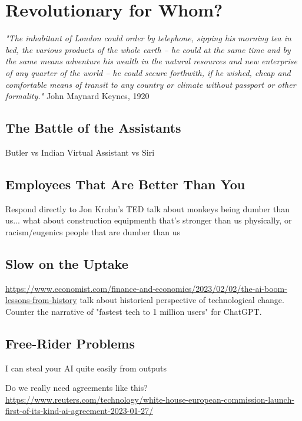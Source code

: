 \setchapterpreamble[u]{\margintoc}
\chapter{Revolutionary for Whom?}

\textit{"The inhabitant of London could order by telephone, sipping his morning tea in bed, the various products of the whole earth -- he could at the same time and by the same means adventure his wealth in the natural resources and new enterprise of any quarter of the world -- he could secure forthwith, if he wished, cheap and comfortable means of transit to any country or climate without passport or other formality."} John Maynard Keynes, 1920 \cite{Keynes2012}

\section{The Battle of the Assistants}

Butler vs Indian Virtual Assistant vs Siri

\section{Employees That Are Better Than You}

Respond directly to Jon Krohn's TED talk about monkeys being dumber than us... what about construction equipmenth that's stronger than us physically, or racism/eugenics people that are dumber than us 

\section{Slow on the Uptake}

\url{https://www.economist.com/finance-and-economics/2023/02/02/the-ai-boom-lessons-from-history} talk about historical perspective of technological change. Counter the narrative of "fastest tech to 1 million users" for ChatGPT.

\section{Free-Rider Problems}

I can steal your AI quite easily from outputs

Do we really need agreements like this? \url{https://www.reuters.com/technology/white-house-european-commission-launch-first-of-its-kind-ai-agreement-2023-01-27/}

